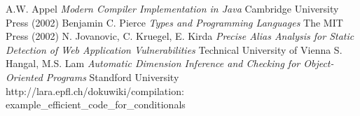\documentclass[a4paper]{article}
\begin{document}
\begin{thebibliography}{99}
  A.W. Appel {\it Modern Compiler Implementation in Java}
    Cambridge University Press (2002)
  Benjamin C. Pierce {\it Types and Programming Languages} The
    MIT Press (2002)
  N. Jovanovic, C. Kruegel, E. Kirda {\it Precise Alias
    Analysis for Static Detection of Web Application Vulnerabilities} Technical
    University of Vienna
  S. Hangal, M.S. Lam {\it Automatic Dimension Inference and
    Checking for Object-Oriented Programs} Standford University
  \mbox{http://lara.epfl.ch/dokuwiki/compilation:}
    \mbox{example\_efficient\_code\_for\_conditionals}
\end{thebibliography}
\end{document}
